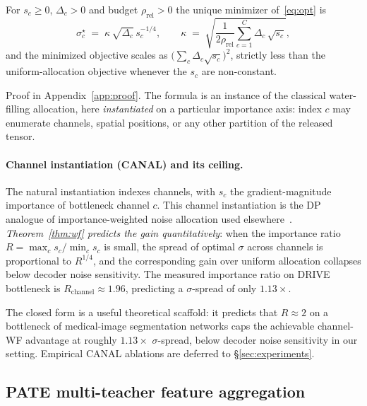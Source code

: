 \begin{theorem}
\label{thm:wf}
For $s_c \ge 0$, $\Delta_c > 0$ and budget $\rho_{\mathrm{rel}} > 0$
the unique minimizer of~\eqref{eq:opt} is
\begin{equation}
\sigma_c^{\star} \;=\; \kappa \,\sqrt{\Delta_c}\, s_c^{-1/4},
\qquad
\kappa \;=\; \sqrt{\frac{1}{2\rho_{\mathrm{rel}}}
                          \sum_{c=1}^{C}\Delta_c\,\sqrt{s_c}},
\label{eq:wf}
\end{equation}
and the minimized objective scales as
$\bigl(\sum_c \Delta_c\sqrt{s_c}\bigr)^2$, strictly less than the
uniform-allocation objective whenever the $s_c$ are non-constant.
\end{theorem}

Proof in Appendix~\ref{app:proof}. The formula is an instance of the
classical water-filling allocation, here \emph{instantiated} on a
particular importance axis: index $c$ may enumerate channels, spatial
positions, or any other partition of the released tensor.

\paragraph{Channel instantiation (CANAL) and its ceiling.}
The natural instantiation indexes channels, with $s_c$ the
gradient-magnitude importance of bottleneck channel $c$. This channel
instantiation is the DP analogue of importance-weighted noise
allocation used elsewhere~\cite{li2024anadp,yilmaz2025csi}.
\emph{Theorem~\ref{thm:wf} predicts the gain quantitatively}: when
the importance ratio $R = \max_c s_c / \min_c s_c$ is small, the
spread of optimal $\sigma$ across channels is proportional to
$R^{1/4}$, and the corresponding gain over uniform allocation collapses
below decoder noise sensitivity. The measured importance ratio on
DRIVE bottleneck is $R_{\mathrm{channel}}\!\approx\!1.96$, predicting
a $\sigma$-spread of only $1.13\times$.

The closed form is a useful theoretical scaffold: it predicts that
$R\!\approx\!2$ on a bottleneck of medical-image segmentation networks
caps the achievable channel-WF advantage at roughly $1.13\times$
$\sigma$-spread, below decoder noise sensitivity in our setting.
Empirical CANAL ablations are deferred to \S\ref{sec:experiments}.

\subsection{PATE multi-teacher feature aggregation}
\label{ssec:pate}

